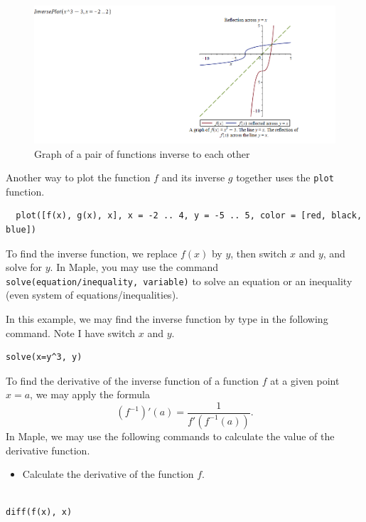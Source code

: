 \documentclass[]{book}
\providecommand{\tightlist}{%
  \setlength{\itemsep}{0pt}\setlength{\parskip}{0pt}}
\theoremstyle{definition}
\theoremstyle{definition}
\theoremstyle{definition}
\theoremstyle{remark}
\begin{document}
\begin{figure}
\centering
\includegraphics{figs/InversePlot1.png}
\caption{Graph of a pair of functions inverse to each other}
\end{figure}

Another way to plot the function \(f\) and its inverse \(g\) together uses the \texttt{plot} function.

\begin{verbatim}
  plot([f(x), g(x), x], x = -2 .. 4, y = -5 .. 5, color = [red, black, blue])
\end{verbatim}

To find the inverse function, we replace \(f(x)\) by \(y\), then switch \(x\) and \(y\), and solve for \(y\). In Maple, you may use the command \texttt{solve(equation/inequality,\ variable)} to solve an equation or an inequality (even system of equations/inequalities).

In this example, we may find the inverse function by type in the following command. Note I have switch \(x\) and \(y\).

\begin{verbatim}
solve(x=y^3, y)
\end{verbatim}

To find the derivative of the inverse function of a function \(f\) at a given point \(x=a\), we may apply the formula
\[(f^{-1})'(a)=\dfrac{1}{f'(f^{-1}(a))}.\]
In Maple, we may use the following commands to calculate the value of the derivative function.

\begin{itemize}
\tightlist
\item
  Calculate the derivative of the function \(f\).
\end{itemize}

\begin{verbatim}

diff(f(x), x)
\end{verbatim}
\end{document}
